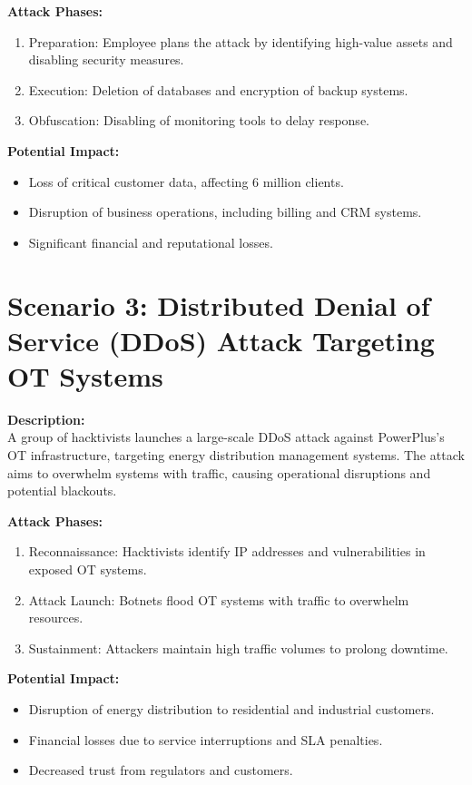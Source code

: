 \textbf{Attack Phases:}
\begin{enumerate}
    \item Preparation: Employee plans the attack by identifying high-value assets and disabling security measures.
    \item Execution: Deletion of databases and encryption of backup systems.
    \item Obfuscation: Disabling of monitoring tools to delay response.
\end{enumerate}

\textbf{Potential Impact:}
\begin{itemize}
    \item Loss of critical customer data, affecting 6 million clients.
    \item Disruption of business operations, including billing and CRM systems.
    \item Significant financial and reputational losses.
\end{itemize}

\section{Scenario 3: Distributed Denial of Service (DDoS) Attack Targeting OT Systems}

\textbf{Description:} \\
A group of hacktivists launches a large-scale DDoS attack against PowerPlus's OT infrastructure, targeting energy distribution management systems. The attack aims to overwhelm systems with traffic, causing operational disruptions and potential blackouts.

\textbf{Attack Phases:}
\begin{enumerate}
    \item Reconnaissance: Hacktivists identify IP addresses and vulnerabilities in exposed OT systems.
    \item Attack Launch: Botnets flood OT systems with traffic to overwhelm resources.
    \item Sustainment: Attackers maintain high traffic volumes to prolong downtime.
\end{enumerate}

\textbf{Potential Impact:}
\begin{itemize}
    \item Disruption of energy distribution to residential and industrial customers.
    \item Financial losses due to service interruptions and SLA penalties.
    \item Decreased trust from regulators and customers.
\end{itemize}
